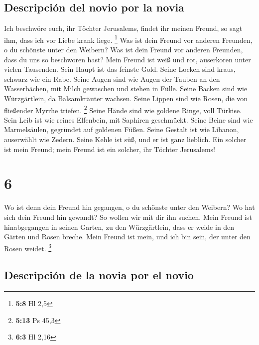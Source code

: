 \hypertarget{descripciuxf3n-del-novio-por-la-novia}{%
\subsection{Descripción del novio por la
novia}\label{descripciuxf3n-del-novio-por-la-novia}}

 Ich beschwöre euch, ihr Töchter Jerusalems, findet ihr
meinen Freund, so sagt ihm, dass ich vor Liebe krank liege. \footnote{\textbf{5:8}
  Hl 2,5}  Was ist dein Freund vor anderen Freunden, o du
schönste unter den Weibern? Was ist dein Freund vor anderen Freunden,
dass du uns so beschworen hast?  Mein Freund ist weiß und
rot, auserkoren unter vielen Tausenden.  Sein Haupt ist
das feinste Gold. Seine Locken sind kraus, schwarz wie ein Rabe.
 Seine Augen sind wie Augen der Tauben an den
Wasserbächen, mit Milch gewaschen und stehen in Fülle. 
Seine Backen sind wie Würzgärtlein, da Balsamkräuter wachsen. Seine
Lippen sind wie Rosen, die von fließender Myrrhe triefen. \footnote{\textbf{5:13}
  Ps 45,3}  Seine Hände sind wie goldene Ringe, voll
Türkise. Sein Leib ist wie reines Elfenbein, mit Saphiren geschmückt.
 Seine Beine sind wie Marmelsäulen, gegründet auf
goldenen Füßen. Seine Gestalt ist wie Libanon, auserwählt wie Zedern.
 Seine Kehle ist süß, und er ist ganz lieblich. Ein
solcher ist mein Freund; mein Freund ist ein solcher, ihr Töchter
Jerusalems!

\hypertarget{section-5}{%
\section{6}\label{section-5}}

 Wo ist denn dein Freund hin gegangen, o du schönste unter
den Weibern? Wo hat sich dein Freund hin gewandt? So wollen wir mit dir
ihn suchen.  Mein Freund ist hinabgegangen in seinen
Garten, zu den Würzgärtlein, dass er weide in den Gärten und Rosen
breche.  Mein Freund ist mein, und ich bin sein, der unter
den Rosen weidet. \footnote{\textbf{6:3} Hl 2,16}

\hypertarget{descripciuxf3n-de-la-novia-por-el-novio-1}{%
\subsection{Descripción de la novia por el
novio}\label{descripciuxf3n-de-la-novia-por-el-novio-1}}

